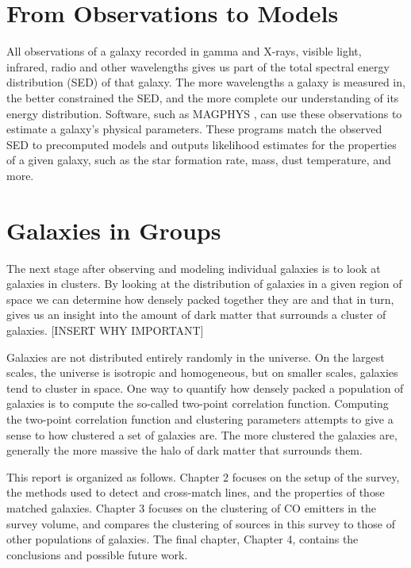 \documentclass[twoside,single]{lion-msc}
\begin{document}
\section{From Observations to Models}

All observations of a galaxy recorded in gamma and X-rays, visible light, infrared, radio and other wavelengths gives us part of the total spectral energy distribution (SED) of that galaxy. The more wavelengths a galaxy is measured in, the better constrained the SED, and the more complete our understanding of its energy distribution. Software, such as MAGPHYS \cite{da2008simple, da2015alma}, can use these observations to estimate a galaxy's physical parameters. These programs match the observed SED to precomputed models and outputs likelihood estimates for the properties of a given galaxy, such as the star formation rate, mass, dust temperature, and more.

\section{Galaxies in Groups}

The next stage after observing and modeling individual galaxies is to look at galaxies in clusters. By looking at the distribution of galaxies in a given region of space we can determine how densely packed together they are and that in turn, gives us an insight into the amount of dark matter that surrounds a cluster of galaxies. [INSERT WHY IMPORTANT]

Galaxies are not distributed entirely randomly in the universe. On the largest scales, the universe is isotropic and homogeneous, but on smaller scales, galaxies tend to cluster in space. One way to quantify how densely packed a population of galaxies is to compute the so-called two-point correlation function. Computing the two-point correlation function and clustering parameters attempts to give a sense to how clustered a set of galaxies are. The more clustered the galaxies are, generally the more massive the halo of dark matter that surrounds them.

This report is organized as follows. Chapter 2 focuses on the setup of the survey, the methods used to detect and cross-match lines, and the properties of those matched galaxies. Chapter 3 focuses on the clustering of CO emitters in the survey volume, and compares the clustering of sources in this survey to those of other populations of galaxies. The final chapter, Chapter 4, contains the conclusions and possible future work. 
\end{document}
